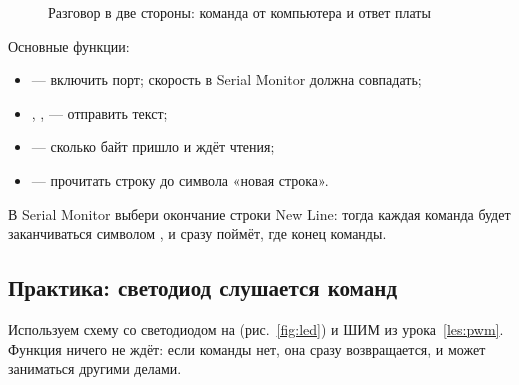 \begin{figure}[H]
\centering
{}
\caption{Разговор в две стороны: команда от компьютера и ответ платы}
\end{figure}

Основные функции:
\begin{itemize}
  \item {} --- включить порт; скорость в Serial Monitor должна совпадать;
  \item {}, ,  --- отправить текст;
  \item {} --- сколько байт пришло и ждёт чтения;
  \item {} --- прочитать строку до символа «новая строка».
\end{itemize}

\begin{tip}
В Serial Monitor выбери окончание строки \textsf{New Line}: тогда каждая команда будет
заканчиваться символом , и  сразу поймёт, где конец команды.
\end{tip}

\subsection{Практика: светодиод слушается команд}

Используем схему со светодиодом на  (рис.~\ref{fig:led}) и ШИМ из урока~\ref{les:pwm}. Функция
 ничего не ждёт: если команды нет, она сразу возвращается, и  может
заниматься другими делами.

